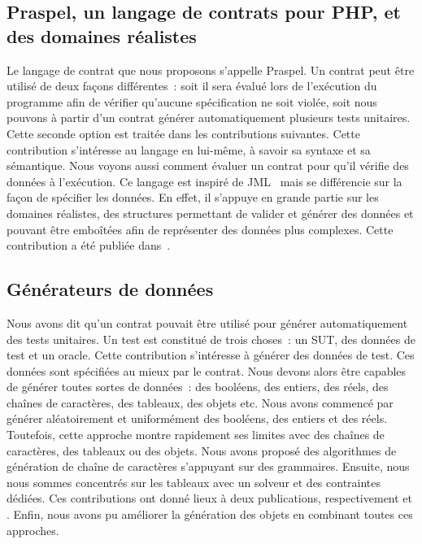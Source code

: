 \subsection{Praspel, un langage de contrats pour PHP, et des domaines réalistes}

Le langage de contrat que nous proposons s'appelle {\strong Praspel}. Un contrat
peut être utilisé de deux façons différentes~: soit il sera évalué lors de
l'exécution du programme afin de vérifier qu'aucune spécification ne soit
violée, soit nous pouvons à partir d'un contrat générer automatiquement
plusieurs tests unitaires. Cette seconde option est traitée dans les
contributions suivantes. Cette contribution s'intéresse au langage en lui-même,
à savoir sa syntaxe et sa sémantique. Nous voyons aussi comment évaluer un
contrat pour qu'il vérifie des données à l'exécution. Ce langage est inspiré de
JML~ mais se différencie sur la façon de spécifier les données. En
effet, il s'appuye en grande partie sur les {\strong domaines réalistes}, des
structures permettant de valider et générer des données et pouvant être
emboîtées afin de représenter des données plus complexes. Cette contribution a
été publiée dans~.

\subsection{Générateurs de données}

Nous avons dit qu'un contrat pouvait être utilisé pour générer automatiquement
des tests unitaires. Un test est constitué de trois choses~: un SUT, des données
de test et un oracle. Cette contribution s'intéresse à générer des données de
test. Ces données sont spécifiées au mieux par le contrat. Nous devons alors
être capables de générer toutes sortes de données~: des booléens, des entiers,
des réels, des chaînes de caractères, des tableaux, des objets etc. Nous avons
commencé par générer aléatoirement et uniformément des booléens, des entiers et
des réels. Toutefois, cette approche montre rapidement ses limites avec des
chaînes de caractères, des tableaux ou des objets. Nous avons proposé des
algorithmes de génération de chaîne de caractères s'appuyant sur des
grammaires. Ensuite, nous nous sommes concentrés sur les tableaux avec un
solveur et des contraintes dédiées. Ces contributions ont donné lieux à deux
publications, respectivement  et .
Enfin, nous avons pu améliorer la génération des objets en combinant toutes ces
approches.

